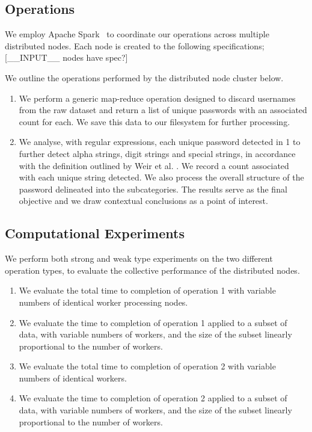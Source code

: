 \documentclass{article}
\begin{document}
\begin{multicols}{2}
\subsection*{Operations}
We employ Apache Spark~\cite{apache-spark} to coordinate our operations across multiple distributed nodes. Each node is created to the following specifications; [\_\_INPUT\_\_ nodes have spec?]
\par We outline the operations performed by the distributed node cluster below.
\begin{enumerate}[1.]
\item We perform a generic map-reduce operation designed to discard usernames from the raw dataset and return a list of unique passwords with an associated count for each. We save this data to our filesystem for further processing.
\item We analyse, with regular expressions, each unique password detected in 1 to further detect alpha strings, digit strings and special strings, in accordance with the definition outlined by Weir et al. \cite{weir2009password}. We record a count associated with each unique string detected. We also process the overall structure of the password delineated into the subcategories. The results serve as the final objective and we draw contextual conclusions as a point of interest.
\end{enumerate}

\subsection*{Computational Experiments}
We perform both strong and weak type experiments on the two different operation types, to evaluate the collective performance of the distributed nodes.

\begin{enumerate}[1.]
\item We evaluate the total time to completion of operation 1 with variable numbers of identical worker processing nodes.
\item We evaluate the time to completion of operation 1 applied to a subset of data, with variable numbers of workers, and the size of the subset linearly proportional to the number of workers.
\item We evaluate the total time to completion of operation 2 with variable numbers of identical workers.
\item We evaluate the time to completion of operation 2 applied to a subset of data, with variable numbers of workers, and the size of the subset linearly proportional to the number of workers.
\end{enumerate}


\end{multicols}
\end{document}
